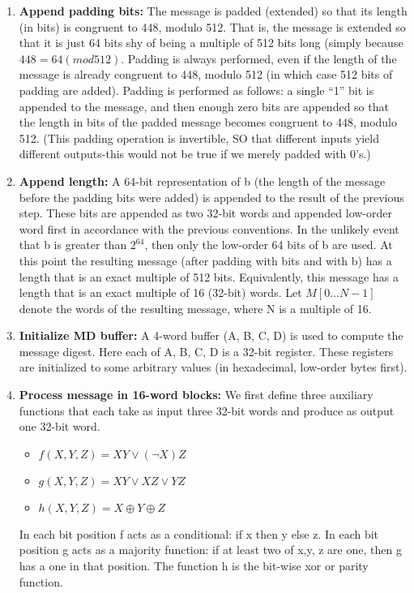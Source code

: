 \documentclass{article}
\newcommand*\xor{\mathbin{\oplus}}
\begin{document}
\begin{enumerate}
    \item \textbf{Append padding bits:} The message is padded (extended) so that its length  (in bits) is congruent to 448, modulo 512. That is, the message is extended so that it is just 64 bits shy of being a  multiple of 512 bits long (simply because $448=64(mod512)$. Padding is  always performed, even if  the length of the message is  already congruent to 448, modulo 512 (in which case 512 bits of padding are added). Padding is performed as follows: a single “1” bit is appended to the message, and then enough zero bits are appended so that the length in bits of the padded message becomes congruent to 448, modulo 512. (This padding operation is invertible, SO that different inputs yield  different outputs-this would not  be true if we merely padded with 0’s.)
    \item \textbf{Append  length:} A 64-bit representation of b (the length of the message  before the padding  bits were added) is appended to the result of the previous step. These bits are appended as two 32-bit  words and appended low-order word first in accordance with the previous conventions. In the unlikely event that b is greater than $2^64$, then only the low-order 64 bits of b are used. At this point the resulting message (after padding  with bits  and  with b) has a length that is  an exact  multiple of 512 bits. Equivalently, this message has a length that is an exact  multiple of 16 (32-bit) words.  Let $M[0.. . N - 1]$ denote the words of the resulting message, where N is  a multiple of 16.
    \item \textbf{Initialize MD buffer:} A 4-word buffer (A, B, C, D) is used to compute the message digest.  Here each of A, B, C, D is a  32-bit register.  These  registers are initialized to some arbitrary values (in hexadecimal, low-order bytes first).
    \item \textbf{Process message in 16-word blocks:} We first  define three auxiliary functions that each take as input three 32-bit words and produce as output one 32-bit word. 
    \begin{itemize}
        \item $f(X,Y,Z)=XY \vee (\neg X)Z$
        \item $g(X,Y,Z)=XY \vee XZ \vee YZ$
        \item $h(X,Y,Z)=X \xor Y \xor Z$
    \end{itemize}
    In each bit position f acts as a conditional: if x then y else z. In each bit position g acts as a  majority function: if at least  two of x,y, z are one, then g has a one in that position. The function h is  the bit-wise xor or parity function.
    

\end{enumerate}
\end{document}
